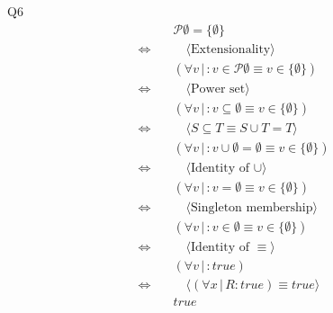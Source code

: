\documentclass{article}
\begin{document}
    \vspace{10mm}
    Q6
    \begin{align*}
        & \quad \mathcal{P}\emptyset = \{\emptyset\} \\
        \Longleftrightarrow & \qquad \langle \text{Extensionality} \rangle \\
        & \quad (\forall v\,|\,: v \in \mathcal{P}\emptyset \equiv v \in \{\emptyset\}) \\
        \Longleftrightarrow & \qquad \langle \text{Power set} \rangle \\
        & \quad (\forall v\,|\,: v \subseteq \emptyset \equiv v \in \{\emptyset\}) \\
        \Longleftrightarrow & \qquad \langle S \subseteq T \equiv S \cup T = T \rangle \\
        & \quad (\forall v\,|\,: v \cup \emptyset = \emptyset \equiv v \in \{\emptyset\}) \\
        \Longleftrightarrow & \qquad \langle \text{Identity of } \cup \rangle \\
        & \quad (\forall v\,|\,: v = \emptyset \equiv v \in \{\emptyset\}) \\
        \Longleftrightarrow & \qquad \langle \text{Singleton membership} \rangle \\
        & \quad (\forall v\,|\,: v \in \emptyset \equiv v \in \{\emptyset\}) \\
        \Longleftrightarrow & \qquad \langle \text{Identity of } \equiv \rangle \\
        & \quad (\forall v\,|\,: true) \\
        \Longleftrightarrow & \qquad \langle (\forall x\, |\, R : true) \equiv true \rangle \\
        & \quad true \\
    \end{align*}
\end{document}
